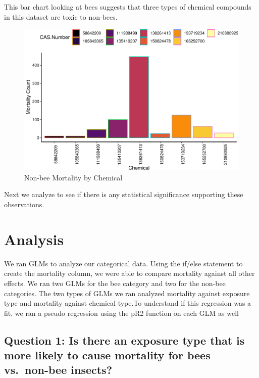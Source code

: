 \documentclass[
  12pt,
]{article}
\begin{document}
\newpage

This bar chart looking at bees suggests that three types of chemical
compounds in this dataset are toxic to non-bees.

\begin{figure}
\centering
\includegraphics{UpdatedwithModel_files/figure-latex/non bee chemical-1.pdf}
\caption{Non-bee Mortality by Chemical}
\end{figure}

Next we analyze to see if there is any statistical significance
supporting these observations. \newpage

\hypertarget{analysis}{%
\section{Analysis}\label{analysis}}

We ran GLMs to analyze our categorical data. Using the if/else statement
to create the mortality column, we were able to compare mortality
against all other effects. We ran two GLMs for the bee category and two
for the non-bee categories. The two types of GLMs we ran analyzed
mortality against exposure type and mortality against chemical type.To
understand if this regression was a fit, we ran a pseudo regression
using the pR2 function on each GLM as well

\hypertarget{question-1-is-there-an-exposure-type-that-is-more-likely-to-cause-mortality-for-bees-vs.-non-bee-insects}{%
\subsection{Question 1: Is there an exposure type that is more likely to
cause mortality for bees vs.~non-bee
insects?}\label{question-1-is-there-an-exposure-type-that-is-more-likely-to-cause-mortality-for-bees-vs.-non-bee-insects}}
\end{document}
